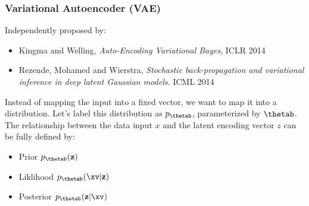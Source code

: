 
 






\newcommand{\vphi}{\bm{\phi}}


\begin{frame}
\frametitle{Variational Autoencoder (VAE)}

    
 Independently proposed by:
\small{
\begin{itemize}
\item Kingma and Welling, \emph{Auto-Encoding Variational Bayes}, ICLR 2014
\item Rezende, Mohamed and Wierstra, \emph{Stochastic back-propagation and variational inference in deep latent Gaussian models.} ICML 2014
\end{itemize}}

\vspace{2mm}
    Instead of mapping the input into a fixed vector, we want to map it into a distribution. Let's label this distribution as $p_{\thetab}$, parameterized by ${\thetab}$. The relationship between the data input $x$ and the latent encoding vector $z$ can be fully defined by:

\begin{itemize}
\item Prior $p_{\thetab}(\mathbf{z})$
\item Liklihood $p_{\thetab}( \xv|\mathbf{z})$
\item Posterior $p_{\thetab}(\mathbf{z} | \xv)$
\end{itemize}
    
    







%


\end{frame}
